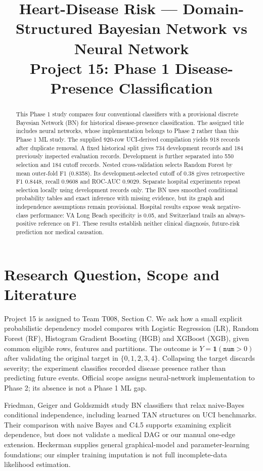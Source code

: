 \documentclass[conference]{IEEEtran}
\title{Heart-Disease Risk --- Domain-Structured Bayesian Network vs Neural Network\\\large Project 15: Phase 1 Disease-Presence Classification}
\author{\IEEEauthorblockN{Nishtha Gupta (2401010303), Aditya Srivastava (2401010039)\\
Aanya Mehrotra (2401010006), Shrijan Sanidhya (2401010449)\\
Abhay Mallik (2401020002)}
\IEEEauthorblockA{Team T008, Section C\\Newton School of Technology, Rishihood University}}
\begin{document}
\maketitle
\begin{abstract}
This Phase 1 study compares four conventional classifiers with a provisional discrete Bayesian Network (BN) for historical disease-presence classification. The assigned title includes neural networks, whose implementation belongs to Phase 2 rather than this Phase 1 ML study. The supplied 920-row UCI-derived compilation yields 918 records after duplicate removal. A fixed historical split gives 734 development records and 184 previously inspected evaluation records. Development is further separated into 550 selection and 184 cutoff records. Nested cross-validation selects Random Forest by mean outer-fold F1 (0.8358). Its development-selected cutoff of 0.38 gives retrospective F1 0.8448, recall 0.9608 and ROC-AUC 0.9029. Separate hospital experiments repeat selection locally using development records only. The BN uses smoothed conditional probability tables and exact inference with missing evidence, but its graph and independence assumptions remain provisional. Hospital results expose weak negative-class performance: VA Long Beach specificity is 0.05, and Switzerland trails an always-positive reference on F1. These results establish neither clinical diagnosis, future-risk prediction nor medical causation.
\end{abstract}

\section{Research Question, Scope and Literature}
Project 15 is assigned to Team T008, Section C. We ask how a small explicit probabilistic dependency model compares with Logistic Regression (LR), Random Forest (RF), Histogram Gradient Boosting (HGB) and XGBoost (XGB), given common eligible rows, features and partitions. The outcome is $Y=\mathbf{1}(\texttt{num}>0)$ after validating the original target in $\{0,1,2,3,4\}$. Collapsing the target discards severity; the experiment classifies recorded disease presence rather than predicting future events. Official scope assigns neural-network implementation to Phase 2; its absence is not a Phase 1 ML gap.

Friedman, Geiger and Goldszmidt \cite{classifiers} study BN classifiers that relax naive-Bayes conditional independence, including learned TAN structures on UCI benchmarks. Their comparison with naive Bayes and C4.5 supports examining explicit dependence, but does not validate a medical DAG or our manual one-edge extension. Heckerman \cite{bn} supplies general graphical-model and parameter-learning foundations; our simpler training imputation is not full incomplete-data likelihood estimation.
\end{document}
